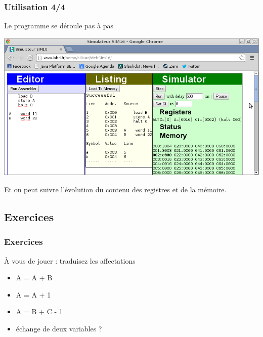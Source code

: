 \begin{frame}
  \frametitle{Utilisation 4/4}

Le programme se déroule pas à pas

\includegraphics[width=\linewidth]{images/cap4.png}

Et on peut suivre l'évolution du contenu des registres et de la mémoire.

\end{frame}


\subsection{Exercices}
\begin{frame}[containsverbatim]
  \frametitle{Exercices}

\alert{À vous de jouer} : traduisez les affectations 

\begin{itemize}
\item A = A + B 
\item A = A + 1 
\item A = B + C - 1 
\item échange de deux variables  ?
\end{itemize}
\end{frame}

